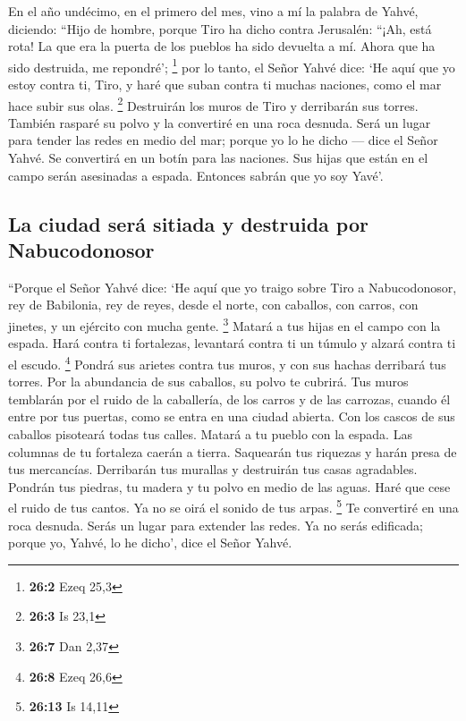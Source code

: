 \begin{paracol}{2}
 En el año undécimo, en el primero del mes, vino a mí la
palabra de Yahvé, diciendo:  ``Hijo de hombre, porque Tiro
ha dicho contra Jerusalén: ``¡Ah, está rota! La que era la puerta de los
pueblos ha sido devuelta a mí. Ahora que ha sido destruida, me
repondré'; \footnote{\textbf{26:2} Ezeq 25,3}  por lo
tanto, el Señor Yahvé dice: `He aquí que yo estoy contra ti, Tiro, y
haré que suban contra ti muchas naciones, como el mar hace subir sus
olas. \footnote{\textbf{26:3} Is 23,1}  Destruirán los
muros de Tiro y derribarán sus torres. También rasparé su polvo y la
convertiré en una roca desnuda.  Será un lugar para tender
las redes en medio del mar; porque yo lo he dicho --- dice el Señor
Yahvé. Se convertirá en un botín para las naciones.  Sus
hijas que están en el campo serán asesinadas a espada. Entonces sabrán
que yo soy Yavé'.

\hypertarget{la-ciudad-seruxe1-sitiada-y-destruida-por-nabucodonosor}{%
\subsection{La ciudad será sitiada y destruida por
Nabucodonosor}\label{la-ciudad-seruxe1-sitiada-y-destruida-por-nabucodonosor}}

 ``Porque el Señor Yahvé dice: `He aquí que yo traigo
sobre Tiro a Nabucodonosor, rey de Babilonia, rey de reyes, desde el
norte, con caballos, con carros, con jinetes, y un ejército con mucha
gente. \footnote{\textbf{26:7} Dan 2,37}  Matará a tus
hijas en el campo con la espada. Hará contra ti fortalezas, levantará
contra ti un túmulo y alzará contra ti el escudo. \footnote{\textbf{26:8}
  Ezeq 26,6}  Pondrá sus arietes contra tus muros, y con
sus hachas derribará tus torres.  Por la abundancia de
sus caballos, su polvo te cubrirá. Tus muros temblarán por el ruido de
la caballería, de los carros y de las carrozas, cuando él entre por tus
puertas, como se entra en una ciudad abierta.  Con los
cascos de sus caballos pisoteará todas tus calles. Matará a tu pueblo
con la espada. Las columnas de tu fortaleza caerán a tierra.
 Saquearán tus riquezas y harán presa de tus mercancías.
Derribarán tus murallas y destruirán tus casas agradables. Pondrán tus
piedras, tu madera y tu polvo en medio de las aguas. 
Haré que cese el ruido de tus cantos. Ya no se oirá el sonido de tus
arpas. \footnote{\textbf{26:13} Is 14,11}  Te convertiré
en una roca desnuda. Serás un lugar para extender las redes. Ya no serás
edificada; porque yo, Yahvé, lo he dicho', dice el Señor Yahvé.


\end{paracol}
